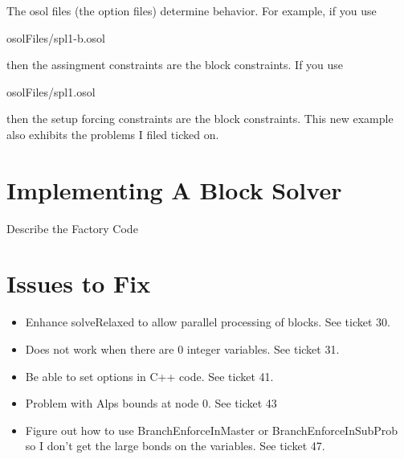 \documentclass[11pt]{article}
\newcounter{Fig}
\begin{document}
The osol files (the option files) determine behavior. For example, if you use

osolFiles/spl1-b.osol

then the assingment constraints are the block constraints. If you use

osolFiles/spl1.osol

then the setup forcing constraints are the block constraints.  This  new  example
also exhibits the problems I filed ticked on.



\section{Implementing A Block Solver}

Describe the Factory Code

\section{Issues to Fix}

\begin{itemize}
  \item Enhance solveRelaxed to allow parallel processing of blocks. See ticket
  30.
  \item Does not work when there are 0 integer variables. See ticket 31.
  \item Be able to set options in C++ code. See ticket 41.
  \item Problem with Alps  bounds at node 0. See ticket 43
  \item Figure out how to use BranchEnforceInMaster or BranchEnforceInSubProb so
  I don't get the large bonds on the variables. See ticket 47.
\end{itemize}




 
\end{document}
